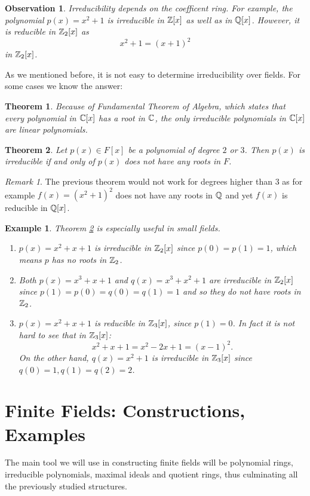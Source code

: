 \documentclass[12pt]{article}
\theoremstyle{plain}
\newtheorem{example}{Example}
\newtheorem{observation}{Observation}
\newtheorem{theorem}{Theorem}
\theoremstyle{definition}
\theoremstyle{remark}
\newtheorem{remark}{Remark}
\begin{document}
\begin{observation}
Irreducibility depends on the coefficent ring. For example, the polynomial $p(x)=x^2+1$ is irreducible in $\mathbb{Z}[x]$ as well as in $\mathbb{Q}[x]$. However, it is reducible in $\mathbb{Z}_2[x]$ as
$$x^2+1=(x+1)^2$$
in $\mathbb{Z}_2[x]$.
\end{observation}

As we mentioned before, it is not easy to determine irreducibility over fields. For some cases we know the answer:
\begin{theorem}
Because of Fundamental Theorem of Algebra, which states that every polynomial in $\mathbb{C}[x]$ has a root in $\mathbb{C}$, the only irreducible polynomials in $\mathbb{C}[x]$ are linear polynomials.
\end{theorem}

\begin{theorem}\label{irr}
Let $p(x)\in F[x]$ be a polynomial of degree $2$ or $3$. Then $p(x)$ is irreducible if and only of $p(x)$ does not have any roots in $F$.
\end{theorem}
\begin{remark}
The previous theorem would not work for degrees higher than $3$ as for example $f(x)=(x^2+1)^2$ does not have any roots in $\mathbb{Q}$ and yet $f(x)$ is reducible in $\mathbb{Q}[x]$.
\end{remark}
\begin{example}
Theorem \ref{irr} is especially useful in small fields.
\begin{enumerate}
    \item $p(x)=x^2+x+1$ is irreducible in $\mathbb{Z}_2[x]$ since $p(0)=p(1)=1$, which means $p$ has no roots in $\mathbb{Z}_2$.
    \item Both $p(x)=x^3+x+1$ and $q(x)=x^3+x^2+1$ are irreducible in $\mathbb{Z}_2[x]$ since $p(1)=p(0)=q(0)=q(1)=1$ and so they do not have roots in $\mathbb{Z}_2$.
    \item $p(x)=x^2+x+1$ is reducible in $\mathbb{Z}_3[x]$, since $p(1)=0$. In fact it is not hard to see that in $\mathbb{Z}_3[x]$:
    $$x^2+x+1 = x^2-2x+1 = (x-1)^2.$$
    On the other hand, $q(x)=x^2+1$ is irreducible in $\mathbb{Z}_3[x]$ since $q(0)=1, q(1)=q(2)=2$.
\end{enumerate}
\end{example}
\section{Finite Fields: Constructions, Examples}
The main tool we will use in constructing finite fields will be polynomial rings, irreducible polynomials, maximal ideals and quotient rings, thus culminating all the previously studied structures.
\end{document}
